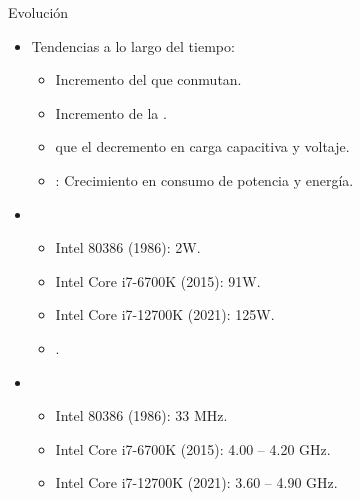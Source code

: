 \begin{frame}[t]{Evolución}
\begin{itemize}
  \item Tendencias a lo largo del tiempo:
    \begin{itemize}
      \item Incremento del  que conmutan.
      \item Incremento de la .
      \item {} que el decremento en carga capacitiva y voltaje.
      \item {}: Crecimiento en consumo de potencia y energía.
    \end{itemize}

  \item {}
    \begin{itemize}
      \item Intel 80386 (1986): 2W.
      \item Intel Core i7-6700K (2015): 91W.
      \item Intel Core i7-12700K (2021): 125W.
      \item {}.
    \end{itemize}

  \item {}
    \begin{itemize}
      \item Intel 80386 (1986): 33 MHz.
      \item Intel Core i7-6700K (2015): 4.00 -- 4.20 GHz.
      \item Intel Core i7-12700K (2021): 3.60 -- 4.90 GHz.
    \end{itemize}
\end{itemize}
\end{frame}

